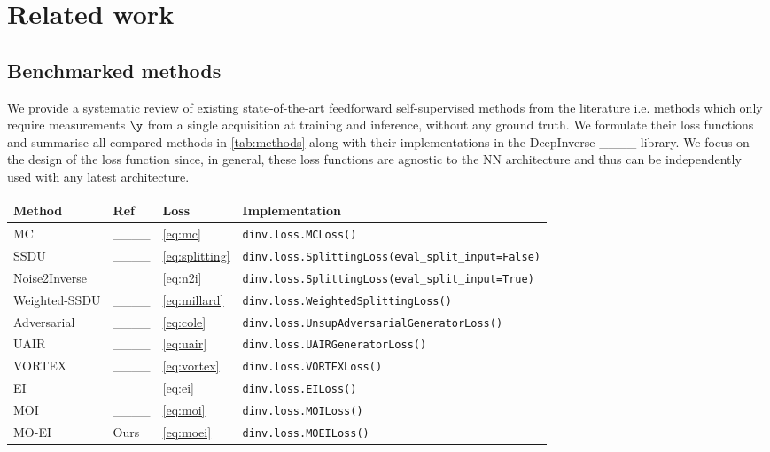 \section{Related work}
\subsection{Benchmarked methods}
\label{sec:benchmark}
We provide a systematic review of existing state-of-the-art feedforward self-supervised methods from the literature i.e. methods which only require measurements $\y$ from a single acquisition at training and inference, without any ground truth. We formulate their loss functions and summarise all compared methods in \cref{tab:methods} along with their implementations in the DeepInverse ____ library. We focus on the design of the loss function since, in general, these loss functions are agnostic to the NN architecture and thus can be independently used with any latest architecture.

\begin{table*}[t]
\centering
\caption{Self-supervised losses reviewed in \cref{sec:benchmark}, implemented in DeepInverse and benchmarked in our experiments.}
\label{tab:methods}
\begin{tabular}{llll}
\hline
Method & Ref & Loss & Implementation \\ \hline
MC & ____ & \cref{eq:mc} & \verb+dinv.loss.MCLoss()+ \\
SSDU & ____ & \cref{eq:splitting} & \verb+dinv.loss.SplittingLoss(eval_split_input=False)+ \\
Noise2Inverse & ____ & \cref{eq:n2i} & \verb+dinv.loss.SplittingLoss(eval_split_input=True)+ \\
Weighted-SSDU & ____ & \cref{eq:millard} & \verb+dinv.loss.WeightedSplittingLoss()+ \\
Adversarial & ____ & \cref{eq:cole} & \verb+dinv.loss.UnsupAdversarialGeneratorLoss()+ \\
UAIR & ____ & \cref{eq:uair} & \verb+dinv.loss.UAIRGeneratorLoss()+ \\
VORTEX & ____ & \cref{eq:vortex} & \verb+dinv.loss.VORTEXLoss()+ \\
EI & ____ & \cref{eq:ei} & \verb+dinv.loss.EILoss()+ \\
MOI & ____ & \cref{eq:moi} & \verb+dinv.loss.MOILoss()+ \\
MO-EI & Ours & \cref{eq:moei} & \verb+dinv.loss.MOEILoss()+ \\ \hline
\end{tabular}
\end{table*}

